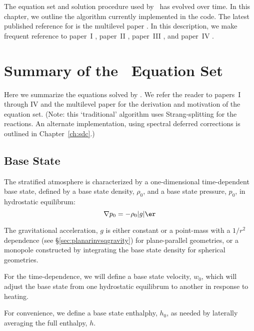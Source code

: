 The equation set and solution procedure used by \maestro\ has evolved
over time.  In this chapter, we outline the algorithm currently
implemented in the code.  The latest published reference for \maestro
is the multilevel paper \cite{multilevel}.  In this description, we
make frequent reference to paper~I \cite{lowMach},
paper~II \cite{lowMach2}, paper~III \cite{lowMach3}, and
paper~IV \cite{lowMach4}.





\section{Summary of the \maestro\ Equation Set}

Here we summarize the equations solved by \maestro.  We refer the reader
to papers~I through IV and the multilevel paper for the derivation
and motivation of the equation set.  (Note: this `traditional' algorithm
uses Strang-splitting for the reactions.  An alternate implementation, using
spectral deferred corrections is outlined in Chapter~\ref{ch:sdc}.)

\subsection{Base State}

The stratified atmosphere is characterized by a one-dimensional
time-dependent base state, defined by a base state density, $\rho_0$,
and a base state pressure, $p_0$, in hydrostatic equilibrum:
\begin{equation}
\nabla p_0 = -\rho_0 |g| \er
\end{equation}

The gravitational acceleration, $g$ is either constant or a point-mass
with a $1/r^2$ dependence (see \S \ref{sec:planarinvsqgravity}) for plane-parallel geometries, or a monopole
constructed by integrating the base state density for spherical
geometries.

For the time-dependence, we will define a base state velocity, $w_0$,
which will adjust the base state from one hydrostatic equilibrum to
another in response to heating.

For convenience, we define a base state enthalphy, $h_0$, as needed
by laterally averaging the full enthalpy, $h$.

